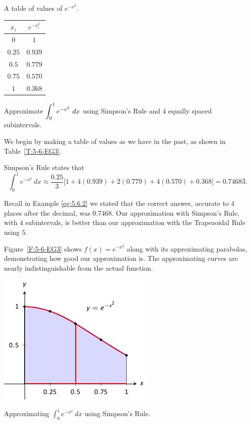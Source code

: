 \begin{margintable}[6cm] %
\begin{center}
\caption{A table of values of $e^{-x^2}$.} 
\label{T:5-6-EG3} 
\begin{tabular}{cc}
$x_i$ & $e^{-x_i^2}$ \\ \hline
$0$ & $1$\\
$0.25$ & $0.939$ \\
$0.5$ & $0.779$ \\
$0.75$ & $0.570$ \\
$1$ & $0.368$\\
\end{tabular}
\end{center}
\end{margintable}


\begin{example} \label{eg:5.6.3} %
Approximate $\displaystyle\int_0^1 e^{-x^2}\ dx$ using Simpson's Rule and $4$ equally spaced subintervals.

\solution We begin by making a table of values as we have in the past, as shown in Table~\ref{T:5-6-EG3}.

Simpson's Rule states that $$\int_0^1e^{-x^2}\ dx \approx \frac{0.25}{3}\Big[1+4(0.939)+2(0.779)+4(0.570) + 0.368\Big] = 0.7468\overline{3}.$$

Recall in Example \ref{eg:5.6.2} we stated that the correct answer, accurate to $4$ places after the decimal, was $0.7468$. Our approximation with Simpson's Rule, with $4$ subintervals, is better than our approximation with the Trapezoidal Rule using $5$.

Figure~\ref{F:5-6-EG3} shows $f(x) = e^{-x^2}$ along with its approximating parabolas, demonstrating how good our approximation is. The approximating curves are nearly indistinguishable from the actual function.
\end{example}

\begin{marginfigure}[-1cm] %
\includegraphics{figures/fignum5b} %
\caption{Approximating $\int_0^1 e^{-x^2}\ dx$ using Simpson's Rule.}
\label{F:5-6-EG3}
\end{marginfigure}